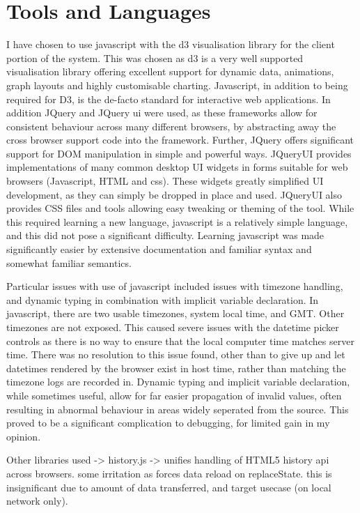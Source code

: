 \chapter{Tools and Languages}\label{langs}

I have chosen to use javascript with the d3 visualisation library \cite{bostock2011d3} for the client portion of the system. This was chosen as d3 is a very well supported visualisation library offering excellent support for dynamic data, animations, graph layouts and highly customisable charting. Javascript, in addition to being required for D3, is the de-facto standard for interactive web applications. 
In addition JQuery and JQuery ui were used, as these frameworks allow for consistent behaviour across many different browsers, by abstracting away the cross browser support code into the framework. Further, JQuery offers significant support for DOM manipulation in simple and powerful ways. JQueryUI provides implementations of many common desktop UI widgets in forms suitable for web browsers (Javascript, HTML and css). These widgets greatly simplified UI development, as they can simply be dropped in place and used. JQueryUI also provides CSS files and tools allowing easy tweaking or theming of the tool.
While this required learning a new language, javascript is a relatively simple language, and this did not pose a significant difficulty. Learning javascript was made significantly easier by extensive documentation and familiar syntax and somewhat familiar semantics. 

Particular issues with use of javascript included issues with timezone handling, and dynamic typing in combination with implicit variable declaration. In javascript, there are two usable timezones, system local time, and GMT. Other timezones are not exposed. This caused severe issues with the datetime picker controls as there is no way to ensure that the local computer time matches server time. There was no resolution to this issue found, other than to give up and let datetimes rendered by the browser exist in host time, rather than matching the timezone logs are recorded in. 
Dynamic typing and implicit variable declaration, while sometimes useful, allow for far easier propagation of invalid values, often resulting in abnormal behaviour in areas widely seperated from the source. This proved to be a significant complication to debugging, for limited gain in my opinion. 

Other libraries used -> 
history.js -> unifies handling of HTML5 history api across browsers. some irritation as forces data reload on replaceState. this is insignificant due to amount of data transferred, and target usecase (on local network only).

